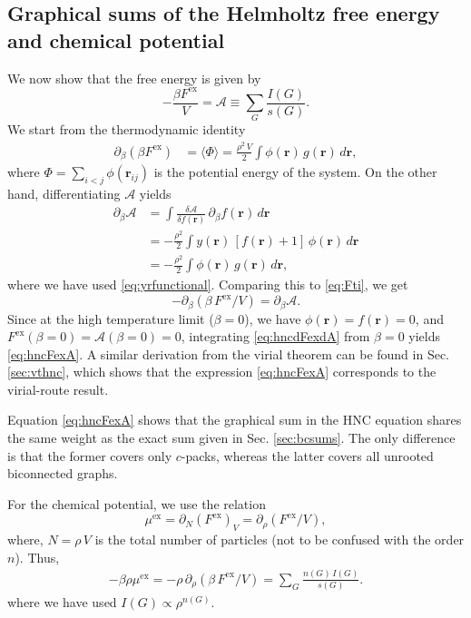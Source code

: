 \documentclass[preprint]{revtex4-1}
\newcommand{\vct}[1]{\mathbf{#1}}
\providecommand{\vr}{} %
\renewcommand{\vr}{\vct{r}}
\newcommand{\supex}[1]{ { { #1 }^{ \mathrm{ex} } } }
\newcommand{\Fex}{\supex{F}}
\newcommand{\muex}{\supex{\mu}}
\newcommand{\A}{\mathcal{A}}
\begin{document}
\subsection{\label{sec:hncFex}Graphical sums of the Helmholtz free energy and chemical potential}


We now show that the free energy is given by\cite{morita1958, *morita1960}
\begin{equation}
  -\frac{ \beta \Fex }{V}
=
  \A \equiv \sum_G \frac{ I(G) }{ s(G) }.
\label{eq:hncFexA}
\end{equation}
%
We start from the thermodynamic identity
\begin{align}
  \partial_\beta (\beta \Fex)
&=
 \langle \Phi \rangle
=
\frac{\rho^2 \, V}{2} \int
  \phi(\vr) \, g(\vr) \, d\vr,
  \label{eq:Fti}
\end{align}
where $\Phi = \sum_{i < j} \phi(\vr_{ij})$
is the potential energy of the system.
%
On the other hand, differentiating $\A$ yields
\begin{align*}
  \partial_\beta \A
&=
  \int
  \frac{ \delta \A } { \delta f(\vr) }
  \,
  \partial_\beta f(\vr) \, d\vr
  \\
&=
  -\frac{\rho^2} {2}
  \int
  y(\vr) \, [f(\vr) + 1]
  \, \phi(\vr) \, d\vr
  \\
&=
  -\frac{\rho^2} {2}
  \int \phi(\vr) \, g(\vr) \, d\vr,
\end{align*}
where we have used \eqref{eq:yrfunctional}.
%
Comparing this to \eqref{eq:Fti}, we get
\begin{equation}
  -\partial_\beta(\beta \, \Fex/V) = \partial_\beta \A.
  \label{eq:hncdFexdA}
\end{equation}
Since at the high temperature limit ($\beta = 0$),
we have $\phi(\vr) = f(\vr) = 0$,
and $\Fex(\beta = 0) = \A(\beta = 0) = 0$,
%
integrating \eqref{eq:hncdFexdA} from $\beta = 0$
yields \eqref{eq:hncFexA}.
%
A similar derivation from the virial theorem
can be found in Sec. \ref{sec:vthnc},
which shows that the expression \eqref{eq:hncFexA}
corresponds to the virial-route result\cite{morita1960, morita1960I}.

Equation \eqref{eq:hncFexA} shows that the graphical sum
in the HNC equation shares the same weight as
the exact sum given in Sec. \ref{sec:bcsums}.
%
The only difference is that the former covers only $c$-packs,
whereas the latter covers all unrooted biconnected graphs.


For the chemical potential, we use the relation
\begin{equation}
  \muex = \partial_N(\Fex)_V = \partial_\rho(\Fex/V),
  \label{eq:muexdFex}
\end{equation}
where,
$N = \rho \, V$
is the total number of particles
(not to be confused with the order $n$).
%
Thus,
%
\begin{align}
    - \beta \rho \muex
  =
  -\rho \, \partial_\rho(\beta \, \Fex/V)
  =
    \sum_G \frac{ n(G) \, I(G) } { s(G) }.
\label{eq:hncmugsum}
\end{align}
where we have used $I(G) \propto \rho^{n(G)}$.
\end{document}
